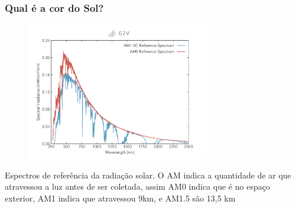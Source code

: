 \documentclass[12pt,brazil]{beamer}
\begin{document}

\begin{frame}
  \frametitle{Qual é a cor do Sol?}
  
    \fontsize{11pt}{11pt}\selectfont
    
        \begin{figure}
          \includegraphics[width=8cm]{figuras/fig11}
        \end{figure}
      
        Espectros de referência da radiação solar. O AM indica a quantidade de ar que atravessou a luz antes de ser coletada, assim AM0 indica que é no espaço exterior, AM1 indica que atravessou 9km, e AM1.5 são 13,5 km
    
\end{frame}



\end{document}
